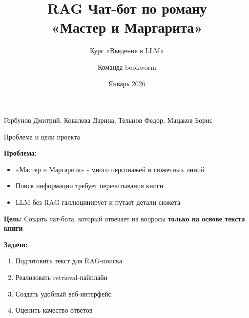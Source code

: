 \documentclass[aspectratio=169,12pt]{beamer}
\title{RAG Чат-бот по роману\\«Мастер и Маргарита»}
\subtitle{Курс «Введение в LLM»}
\author{Команда bookworm}
\institute{ИТМО}
\date{Январь 2026}
\begin{document}
\begin{frame}
\titlepage
\vspace{-1em}
\centering
\small Горбунов Дмитрий, Ковалева Дарина, Тельнов Федор, Мацаков Борис
\end{frame}

\begin{frame}{Проблема и цели проекта}

\textbf{Проблема:}
\begin{itemize}
    \item «Мастер и Маргарита» - много персонажей и сюжетных линий
    \item Поиск информации требует перечитывания книги
    \item LLM без RAG галлюцинирует и путает детали сюжета
\end{itemize}

\vspace{1em}
\textbf{Цель:} Создать чат-бота, который отвечает на вопросы \textbf{только на основе текста книги}

\vspace{1em}
\textbf{Задачи:}
\begin{enumerate}
    \item Подготовить текст для RAG-поиска
    \item Реализовать retrieval-пайплайн
    \item Создать удобный веб-интерфейс
    \item Оценить качество ответов
\end{enumerate}

\end{frame}
\end{document}
